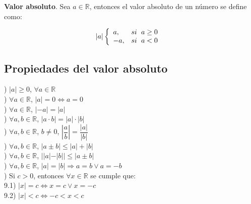\begin{mydef}
\textbf{Valor absoluto}. Sea $a\in\mathbb{R}$, entonces el valor absoluto de un número se define como:\

$$ |a| \left\{\begin{array}{ll}
a, & si \hspace{6px} a\geq 0\\
-a, & si \hspace{6px} a<0 
\end{array} \hspace{6px} \right.$$
\label{absdef}
\end{mydef}

\subsection{Propiedades del valor absoluto}
\label{Propabs}
) $|a|\geq 0$, $\forall a\in\mathbb{R}$ \\

) $\forall a\in\mathbb{R}$, $|a|=0\Leftrightarrow a=0$ \\

) $\forall a\in\mathbb{R}$, $|-a|=|a|$ \\

) $\forall a,b\in\mathbb{R}$, $|a\cdot b|=|a|\cdot|b|$ \\

) $\forall a,b\in\mathbb{R}$, $b\neq 0$, $\left|\dfrac{a}{b}\right|=\dfrac{|a|}{|b|}$ \\

) $\forall a,b\in\mathbb{R}$, $|a \pm b|\leq |a|+|b|$ \\

) $\forall a,b\in\mathbb{R}$, $||a|-|b||\leq |a\pm b|$ \\

) $\forall a,b\in\mathbb{R}$, $|a|=|b|\Rightarrow a=b \vee a= -b$ \\

) Si $c>0$, entonces $\forall x\in\mathbb{R}$ se cumple que:\\

9.1) $|x|=c\Leftrightarrow x=c \vee x=-c$ \\

9.2) $|x|<c\Leftrightarrow -c<x<c$\\

